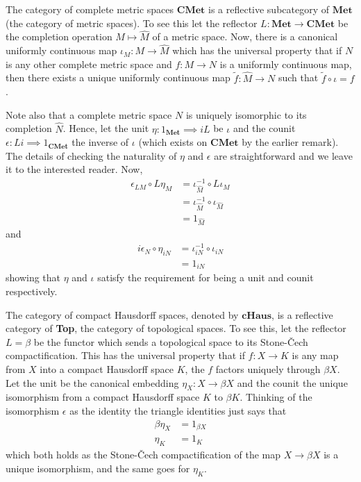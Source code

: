 \begin{example}
  \label{ex:met}
  The category of complete metric spaces $ \mathbf{CMet} $ is a reflective subcategory of $ \mathbf{Met} $ (the category of metric spaces). To see this let the reflector $ L:\mathbf{Met} \to \mathbf{CMet} $ be the completion operation $ M \mapsto \widehat{M} $ of a metric space. Now, there is a canonical uniformly continuous map $ \iota_M: M \to \widehat{M} $ which has the universal property that if $ N $ is any other complete metric space and $ f: M \to N $ is a uniformly continuous map, then there exists a unique uniformly continuous map $ \tilde{f}:\widehat{M} \to N $ such that $ \tilde{f}\circ \iota = f $.

  Note also that a complete metric space $ N $ is uniquely isomorphic to its completion $ \widehat{N} $. Hence, let the unit $ \eta: 1_{\mathbf{Met}} \implies iL $ be $ \iota $ and the counit $ \epsilon: Li \implies 1_{\mathbf{CMet}} $ the inverse of $ \iota $ (which exists on $ \mathbf{CMet} $ by the earlier remark). The details of checking the naturality of $ \eta $ and $ \epsilon $ are straightforward and we leave it to the interested reader. Now,
  \begin{align*}
    \epsilon_{LM} \circ L\eta_M &= \iota^{-1}_{\widehat{M}} \circ L\iota_M \\
                                &= \iota^{-1}_{\widehat{M}} \circ \iota_{\widehat{M}} \\
                                &= 1_{\widehat{M}}
  \end{align*}
  and
  \begin{align*}
    i\epsilon_N \circ \eta_{iN} &= \iota^{-1}_{iN} \circ \iota_{iN} \\
                                &= 1_{iN}
  \end{align*}
  showing that $ \eta $ and $ \iota $ satisfy the requirement for being a unit and counit respectively.
\end{example}

\begin{example}
  \label{ex:haus}
  The category of compact Hausdorff spaces, denoted by $ \mathbf{cHaus} $, is a reflective category of \textbf{Top}, the category of topological spaces. To see this, let the reflector $ L=\beta $ be the functor which sends a topological space to its Stone-\v Cech compactification. This has the universal property that if $ f: X \to K $ is any map from $ X $ into a compact Hausdorff space $ K $, the $ f $ factors uniquely through $ \beta X $. Let the unit be the canonical embedding $ \eta_X: X \to \beta X $ and the counit the unique isomorphism from a compact Hausdorff space $ K $ to $ \beta K $. Thinking of the isomorphism $ \epsilon $ as the identity the triangle identities just says that
  \begin{align*}
    \beta \eta_X &= 1_{\beta X} \\
    \eta_{K} &= 1_{K}
  \end{align*}
  which both holds as the Stone-\v Cech compactification of the map $ X \to \beta X $ is a unique isomorphism, and the same goes for $ \eta_K $.
\end{example}

